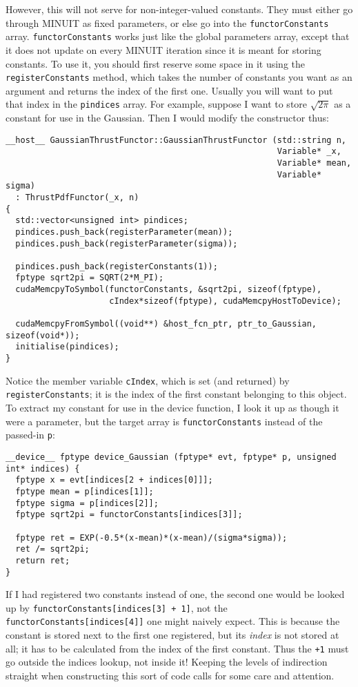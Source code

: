 \documentclass[12pt,pdflatex]{article}
\begin{document}
However, this will not serve for non-integer-valued constants. They must either
go through MINUIT as fixed parameters, or else go into the \verb|functorConstants|
array. \verb|functorConstants| works just like the global parameters
array, except that it does not update on every MINUIT iteration since
it is meant for storing constants. To use it, you should first reserve
some space in it using the \verb|registerConstants| method, which takes
the number of constants you want as an argument and returns the index
of the first one. Usually you will want to put that index in the \verb|pindices|
array. For example, suppose I want to store $\sqrt{2\pi}$ as a constant
for use in the Gaussian. Then I would modify the constructor thus:
\begin{verbatim}
__host__ GaussianThrustFunctor::GaussianThrustFunctor (std::string n, 
                                                       Variable* _x, 
                                                       Variable* mean, 
                                                       Variable* sigma) 
  : ThrustPdfFunctor(_x, n) 
{
  std::vector<unsigned int> pindices;
  pindices.push_back(registerParameter(mean));
  pindices.push_back(registerParameter(sigma));

  pindices.push_back(registerConstants(1)); 
  fptype sqrt2pi = SQRT(2*M_PI);
  cudaMemcpyToSymbol(functorConstants, &sqrt2pi, sizeof(fptype), 
                     cIndex*sizeof(fptype), cudaMemcpyHostToDevice); 

  cudaMemcpyFromSymbol((void**) &host_fcn_ptr, ptr_to_Gaussian, sizeof(void*));
  initialise(pindices); 
}
\end{verbatim}
Notice the member variable \verb|cIndex|, which is set (and returned) by \verb|registerConstants|; it is the
index of the first constant belonging to this object. To extract my constant for
use in the device function, I look it up as though it were a parameter, but the
target array is \verb|functorConstants| instead of the passed-in \verb|p|:
\begin{verbatim}
__device__ fptype device_Gaussian (fptype* evt, fptype* p, unsigned int* indices) {
  fptype x = evt[indices[2 + indices[0]]]; 
  fptype mean = p[indices[1]];
  fptype sigma = p[indices[2]];
  fptype sqrt2pi = functorConstants[indices[3]];

  fptype ret = EXP(-0.5*(x-mean)*(x-mean)/(sigma*sigma));
  ret /= sqrt2pi; 
  return ret; 
}
\end{verbatim}

If I had registered two constants instead of one, the second one would be looked
up by \verb|functorConstants[indices[3] + 1]|, not the \verb|functorConstants[indices[4]]|
one might naively expect. This is because the constant is stored next to the first one
registered, but its \emph{index} is not stored at all; it has to be calculated from the
index of the first constant. Thus the \verb|+1| must go outside the indices lookup,
not inside it! Keeping the levels of indirection
straight when constructing this sort of code calls for some care and attention. 
\end{document}
